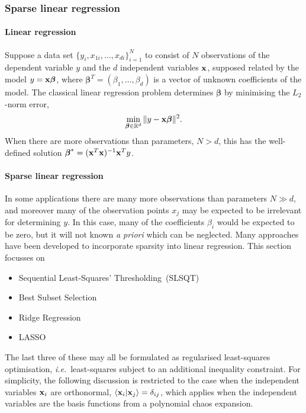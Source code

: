 \subsubsection{Sparse linear regression}\label{sec:sparsereg}

\paragraph{Linear regression}
Suppose a data set $\{y_i,x_{1i},\ldots,x_{di}\}_{i=1}^{N}$ to consist of
$N$ observations of the dependent variable $y$ and the $d$ independent
variables $\mathbf{x}$,
supposed related by the model $y=\mathbf{x}\boldsymbol{\beta}$,
where $\boldsymbol{\beta}^T=(\beta_1,\ldots,\beta_d)$ is a vector of unknown coefficients of the model.
The classical linear regression problem determines $\boldsymbol{\beta}$ by minimising the $L_2$-norm error,
\begin{align}
	\label{eq:linear_regression}
\min_{\boldsymbol{\beta}\in \mathbb{R}^d}\|y - \mathbf{x}\boldsymbol{\beta}\|^2.
\end{align}
When there are more observations than parameters, $N>d$, this has the
well-defined solution $\boldsymbol{\beta}^*=(\mathbf{x}^T\mathbf{x})^{-1}\mathbf{x}^Ty$.

\paragraph{Sparse linear regression}
In some applications there are many more observations than parameters $N\gg d$,
and moreover many of the observation points $x_j$ may be expected to be irrelevant for
determining $y$.
In this case, many of the coefficients $\beta_i$ would be expected to be zero,
but it will not known \emph{a priori} which can be neglected.
Many approaches have been developed to incorporate sparsity into linear regression.
This section focusses on 
\begin{itemize}
\item Sequential Least-Squares' Thresholding~(SLSQT)
\item Best Subset Selection %
\item Ridge Regression
\item LASSO
\end{itemize}
The last three of these
may all be formulated as regularised least-squares optimisation,
\emph{i.e.}\ least-squares subject to an additional inequality constraint.
For simplicity, the following discussion is restricted to the case
when the independent variables $\mathbf{x}_i$ are orthonormal,
$\langle\mathbf{x}_i | \mathbf{x}_j\rangle = \delta_{ij}$,
which applies when the independent variables are the basis functions from a
polynomial chaos expansion.

